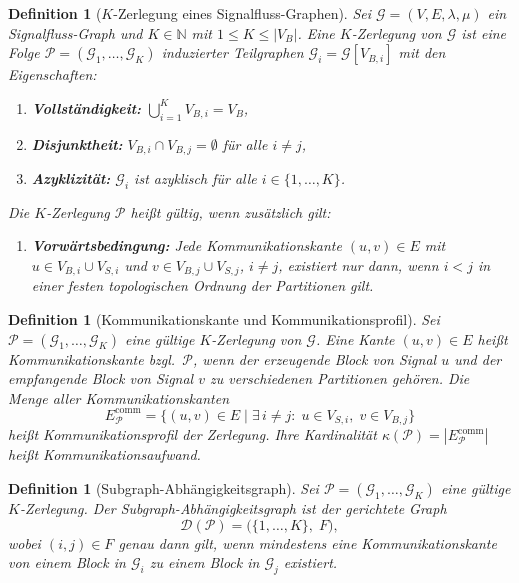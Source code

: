 ﻿\documentclass[12pt,a4paper]{article}
\newtheorem{definition}[theorem]{Definition}
\theoremstyle{definition}
\begin{document}
\begin{definition}[$K$-Zerlegung eines Signalfluss-Graphen]
\label{def:kdecomp}
Sei $\mathcal{G} = (V, E, \lambda, \mu)$ ein Signal\-fluss-Graph und
$K \in \mathbb{N}$ mit $1 \leq K \leq |V_B|$. Eine
\emph{$K$-Zerlegung} von $\mathcal{G}$ ist eine Folge
$\mathcal{P} = (\mathcal{G}_1, \ldots, \mathcal{G}_K)$
induzierter Teilgraphen $\mathcal{G}_i = \mathcal{G}[V_{B,i}]$ mit den
Eigenschaften:
\begin{enumerate}[label=(\alph*)]
  \item \textbf{Vollständigkeit:} $\displaystyle\bigcup_{i=1}^K V_{B,i} = V_B$,
  \item \textbf{Disjunktheit:} $V_{B,i} \cap V_{B,j} = \emptyset$ für alle $i \neq j$,
  \item \textbf{Azyklizität:} $\mathcal{G}_i$ ist azyklisch für alle $i \in \{1,\ldots,K\}$.
\end{enumerate}
Die $K$-Zerlegung $\mathcal{P}$ heißt \emph{gültig}, wenn zusätzlich gilt:
\begin{enumerate}[label=(\alph*), resume]
  \item \textbf{Vorwärtsbedingung:} Jede Kommunikationskante $(u,v) \in E$
        mit $u \in V_{B,i} \cup V_{S,i}$ und $v \in V_{B,j} \cup V_{S,j}$,
        $i \neq j$, existiert nur dann, wenn $i < j$ in einer festen
        topologischen Ordnung der Partitionen gilt.
\end{enumerate}
\end{definition}

\begin{definition}[Kommunikationskante und Kommunikationsprofil]
\label{def:commEdge}
Sei $\mathcal{P} = (\mathcal{G}_1, \ldots, \mathcal{G}_K)$ eine gültige
$K$-Zerlegung von $\mathcal{G}$. Eine Kante $(u,v) \in E$ heißt
\emph{Kommunikationskante} bzgl.\ $\mathcal{P}$, wenn der erzeugende
Block von Signal $u$ und der empfangende Block von Signal $v$ zu
verschiedenen Partitionen gehören. Die Menge aller Kommunikationskanten
\[
  E_{\mathcal{P}}^{\mathrm{comm}}
  = \bigl\{(u,v) \in E \;\big|\;
    \exists\, i \neq j :\; u \in V_{S,i},\; v \in V_{B,j}\bigr\}
\]
heißt \emph{Kommunikationsprofil} der Zerlegung. Ihre Kardinalität
$\kappa(\mathcal{P}) = |E_{\mathcal{P}}^{\mathrm{comm}}|$ heißt
\emph{Kommunikationsaufwand}.
\end{definition}

\begin{definition}[Subgraph-Abhängigkeitsgraph]
\label{def:subdep}
Sei $\mathcal{P} = (\mathcal{G}_1, \ldots, \mathcal{G}_K)$ eine gültige
$K$-Zerlegung. Der \emph{Subgraph-Abhängigkeitsgraph} ist der gerichtete
Graph
\[
  \mathcal{D}(\mathcal{P}) = \bigl(\{1,\ldots,K\},\; F\bigr),
\]
wobei $(i,j) \in F$ genau dann gilt, wenn mindestens eine
Kommunikationskante von einem Block in $\mathcal{G}_i$
zu einem Block in $\mathcal{G}_j$ existiert.
\end{definition}
\end{document}
